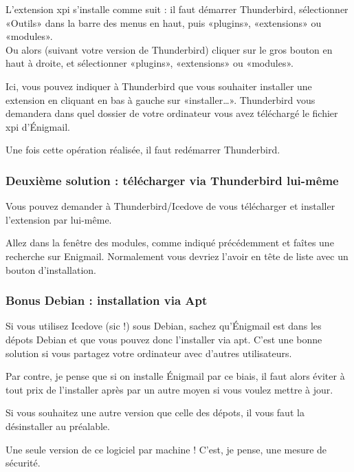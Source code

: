 L'extension xpi s'installe comme suit : il faut démarrer Thunderbird,
sélectionner «Outils» dans la barre des menus en haut, puis «plugins»,
«extensions» ou «modules».\\Ou alors (suivant votre version de
Thunderbird) cliquer sur le gros bouton en haut à droite, et
sélectionner «plugins», «extensions» ou «modules».

Ici, vous pouvez indiquer à Thunderbird que vous souhaiter installer une
extension en cliquant en bas à gauche sur «installer\ldots{}».
Thunderbird vous demandera dans quel dossier de votre ordinateur vous
avez téléchargé le fichier xpi d'Énigmail.

Une fois cette opération réalisée, il faut redémarrer Thunderbird.

\subsubsection{Deuxième solution : télécharger via Thunderbird lui-même}\label{deuxiuxe8me-solution-tuxe9luxe9charger-via-thunderbird-lui-muxeame}

Vous pouvez demander à Thunderbird/Icedove de vous télécharger et
installer l'extension par lui-même.

Allez dans la fenêtre des modules, comme indiqué précédemment et faîtes
une recherche sur Enigmail. Normalement vous devriez l'avoir en tête de
liste avec un bouton d'installation.

\subsubsection{Bonus Debian : installation via Apt}\label{bonus-debian-installation-via-apt}

Si vous utilisez Icedove (sic !) sous Debian, sachez qu'Énigmail est
dans les dépots Debian et que vous pouvez donc l'installer via apt.
C'est une bonne solution si vous partagez votre ordinateur avec d'autres
utilisateurs.

Par contre, je pense que si on installe Énigmail par ce biais, il faut
alors éviter à tout prix de l'installer après par un autre moyen si vous
voulez mettre à jour.

Si vous souhaitez une autre version que celle des dépots, il vous faut
la désinstaller au préalable.

\begin{warning}
Une seule version de ce logiciel par machine ! C'est, je
pense, une mesure de sécurité.
\end{warning}

